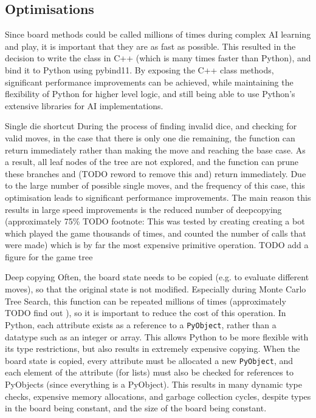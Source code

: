 \subsection{Optimisations}
Since board methods could be called millions of times during complex AI learning and play, it is important that they are as fast as possible. This resulted in the decision to write the class in C++ (which is many times faster than Python), and bind it to Python using pybind11. By exposing the C++ class methods, significant performance improvements can be achieved, while maintaining the flexibility of Python for higher level logic, and still being able to use Python's extensive libraries for AI implementations.

Single die shortcut
During the process of finding invalid dice, and checking for valid moves, in the case that there is only one die remaining, the function can return immediately rather than making the move and reaching the base case. As a result, all leaf nodes of the tree are not explored, and the function can prune these branches and (TODO reword to remove this and) return immediately. Due to the large number of possible single moves, and the frequency of this case, this optimisation leads to significant performance improvements. The main reason this results in large speed improvements is the reduced number of deepcopying (approximately 75\% TODO footnote: This was tested by creating creating a bot which played the game thousands of times, and counted the number of calls that were made) which is by far the most expensive primitive operation.
TODO add a figure for the game tree

Deep copying
Often, the board state needs to be copied (e.g. to evaluate different moves), so that the original state is not modified. Especially during Monte Carlo Tree Search, this function can be repeated millions of times (approximately TODO find out ), so it is important to reduce the cost of this operation. In Python, each attribute exists as a reference to a \texttt{PyObject}, rather than a datatype such as an integer or array. This allows Python to be more flexible with its type restrictions, but also results in extremely expensive copying. When the board state is copied, every attribute must be allocated a new \texttt{PyObject}, and each element of the attribute (for lists) must also be checked for references to PyObjects (since everything is a PyObject). This results in many dynamic type checks, expensive memory allocations, and garbage collection cycles, despite types in the board being constant, and the size of the board being constant.

